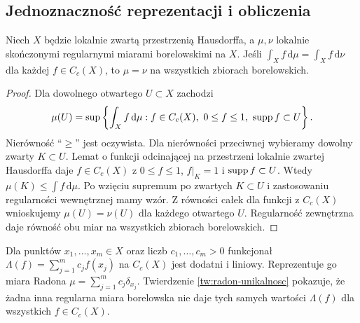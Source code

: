 \subsection*{Jednoznaczność reprezentacji i obliczenia}
\begin{twierdzenie}\label{tw:radon-unikalnosc}
Niech $X$ będzie lokalnie zwartą przestrzenią Hausdorffa, a $\mu,\nu$ lokalnie skończonymi regularnymi miarami borelowskimi na $X$. Jeśli
$\int_X f\,\mathrm d\mu=\int_Xf\,\mathrm d\nu$ dla każdej $f\in C_c(X)$, to $\mu=\nu$ na wszystkich zbiorach borelowskich.
\end{twierdzenie}
\begin{proof}
Dla dowolnego otwartego $U\subset X$ zachodzi
\[
\mu(U)=\sup\left\{\int_X f\,\mathrm d\mu: f\in C_c(X),\ 0\le f\le1,\ \operatorname{supp} f\subset U\right\}.
\]
Nierówność ``$\ge$'' jest oczywista. Dla nierówności przeciwnej wybieramy dowolny zwarty $K\subset U$. Lemat o funkcji odcinającej na przestrzeni lokalnie zwartej Hausdorffa daje $f\in C_c(X)$ z $0\le f\le1$, $f|_K=1$ i $\operatorname{supp} f\subset U$. Wtedy $\mu(K)\le\int f\,\mathrm d\mu$. Po wzięciu supremum po zwartych $K\subset U$ i zastosowaniu regularności wewnętrznej mamy wzór. Z równości całek dla funkcji z $C_c(X)$ wnioskujemy $\mu(U)=\nu(U)$ dla każdego otwartego $U$. Regularność zewnętrzna daje równość obu miar na wszystkich zbiorach borelowskich.
\end{proof}
\begin{przyklad}
Dla punktów $x_1,\dots,x_m\in X$ oraz liczb $c_1,\dots,c_m>0$ funkcjonał $\Lambda(f)=\sum_{j=1}^m c_jf(x_j)$ na $C_c(X)$ jest dodatni i liniowy. Reprezentuje go miara Radona $\mu=\sum_{j=1}^m c_j\delta_{x_j}$. Twierdzenie \ref{tw:radon-unikalnosc} pokazuje, że żadna inna regularna miara borelowska nie daje tych samych wartości $\Lambda(f)$ dla wszystkich $f\in C_c(X)$.
\end{przyklad}

